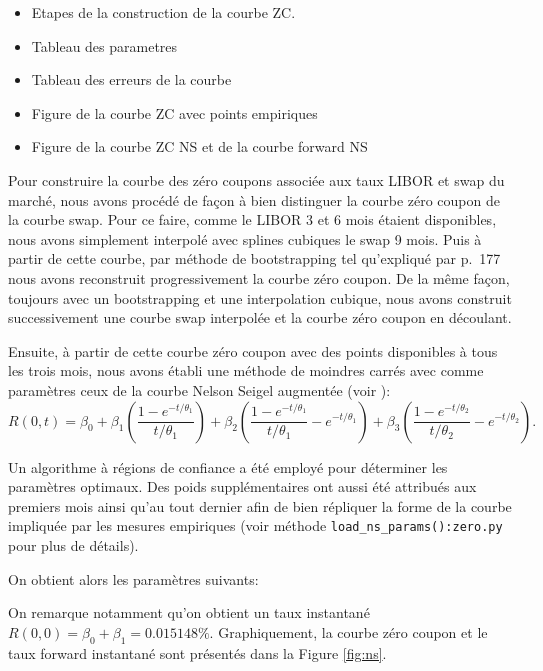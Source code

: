 \begin{itemize}
\item Etapes de la construction de la courbe ZC.
\item Tableau des parametres
\item Tableau des erreurs de la courbe
\item Figure de la courbe ZC avec points empiriques
\item Figure de la courbe ZC NS et de la courbe forward NS
\end{itemize}

Pour construire la courbe des zéro coupons associée aux taux LIBOR et swap du marché, nous
avons procédé de façon à bien distinguer la courbe zéro coupon de la courbe swap. Pour ce
faire, comme le LIBOR 3 et 6 mois étaient disponibles, nous avons simplement interpolé
avec splines cubiques le swap 9 mois. Puis à partir de cette courbe, par méthode de
bootstrapping tel qu'expliqué par \cite{veronesi} p.~177 nous avons reconstruit
progressivement la courbe zéro coupon. De la même façon, toujours avec un bootstrapping et
une interpolation cubique, nous avons construit successivement une courbe swap interpolée
et la courbe zéro coupon en découlant.

Ensuite, à partir de cette courbe zéro coupon avec des points disponibles à tous les trois
mois, nous avons établi une méthode de moindres carrés avec comme paramètres ceux de la
courbe Nelson Seigel augmentée (voir \cite{diebold}):
\[
  R(0,t) = \beta_0 + \beta_1\left(\frac{1-e^{-t/\theta_1}}{t/\theta_1}\right) +
  \beta_2\left(\frac{1-e^{-t/\theta_1}}{t/\theta_1} - e^{-t/\theta_1}\right) +
  \beta_3\left(\frac{1-e^{-t/\theta_2}}{t/\theta_2} - e^{-t/\theta_2}\right).
\]

Un algorithme à régions de confiance \cite{conn2000trust} a été employé pour déterminer
les paramètres optimaux. Des poids supplémentaires ont aussi été attribués aux premiers
mois ainsi qu'au tout dernier afin de bien répliquer la forme de la courbe impliquée par
les mesures empiriques (voir méthode \verb+load_ns_params():zero.py+ pour plus de
détails).

On obtient alors les paramètres suivants:
\begin{center}

\end{center}

On remarque notamment qu'on obtient un taux instantané
$R(0,0) = \beta_0+\beta_1 = \num{0.015148}\%$. Graphiquement, la courbe zéro coupon et le
taux forward instantané sont présentés dans la Figure \ref{fig:ns}.

